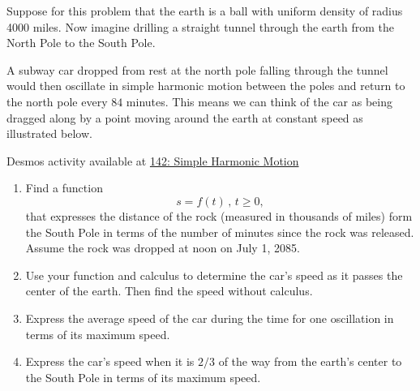 \documentclass{ximera}
\begin{document}
\begin{question}  \label{QKLKLggggghg}
Suppose for this problem that the earth is a ball with uniform density of radius 4000 miles. Now imagine drilling a straight tunnel through the earth from the North Pole to the South Pole. 

A subway car dropped from rest at the north pole falling through the tunnel would then oscillate in simple harmonic motion between the poles and return to the north pole every $84$ minutes. This means we can think of the car as being dragged along by a point moving around the earth at constant speed as illustrated below. 

\begin{onlineOnly}
    \begin{center}
\end{center}
\end{onlineOnly}

Desmos activity available at \href{https://www.desmos.com/calculator/ij8dqowgza}{142: Simple Harmonic Motion}

\begin{enumerate}

\item Find a function 
\[
      s = f(t) \, , \, t\geq 0,
\]
that expresses the distance of the rock (measured in thousands of miles) form the South Pole in terms of the number of minutes since the rock was released. Assume the rock was dropped at noon on July 1, 2085.

\item Use your function and calculus to determine the car's speed as it passes the center of the earth. Then find the speed without calculus.

\item Express the average speed of the car during the time for one oscillation in terms of its maximum speed.

\item Express the car's speed when it is $2/3$ of the way from the earth's center to the South Pole in terms of its maximum speed.


\end{enumerate}

\end{question}
\end{document}
